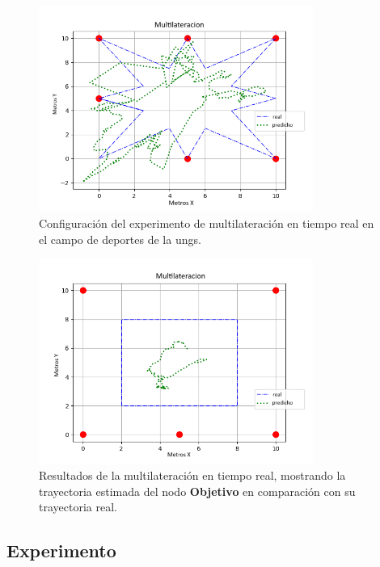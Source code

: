 \begin{figure}[!htb]
\centering
\includegraphics[width=0.8\textwidth]{Figuras/multilateration/multilateration_star.png}
\captionsetup{margin=2cm}
\caption[Configuración de la multilateración en Tiempo Real]{Configuración del experimento de multilateración en tiempo real en el campo de deportes de la \acs{ungs}.}
\label{fig:real-multilateration}
\end{figure}

\begin{figure}[!htb]
\centering
\includegraphics[width=0.8\textwidth]{Figuras/multilateration/multilateration_square.png}
\captionsetup{margin=2cm}
\caption[Resultados de la multilateración en Tiempo Real]{Resultados de la multilateración en tiempo real, mostrando la trayectoria estimada del nodo \textbf{Objetivo} en comparación con su trayectoria real.}
\label{fig:real-multilateration-results}
\end{figure}


\subsection{Experimento}

